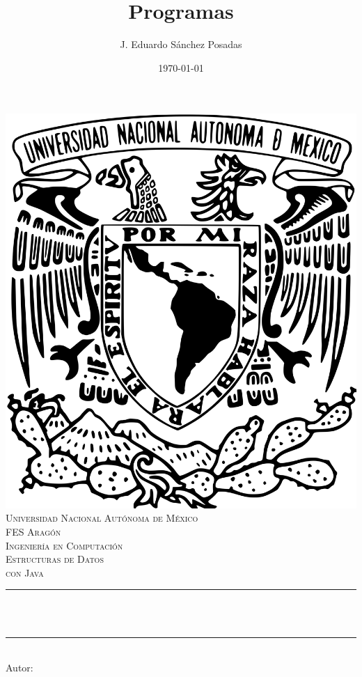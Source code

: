 \documentclass[11pt]{article}
\title{Programas}						%
\author{J. Eduardo Sánchez Posadas}					%
\date{\today}											%
\makeatletter
\let\thetitle\@title
\let\theauthor\@author
\makeatother
\begin{document}

\begin{titlepage}
	\centering
    \vspace*{0.5 cm}
    \includegraphics[scale=0.05]{pics/escudo.png} \\[1.0 cm]	%
    \textsc{\Large Universidad Nacional Autónoma de México}\\[2.0 cm]	%
	\textsc{\Large FES Aragón\\ Ingeniería en Computación}\\[0.5 cm]								%
	\textsc{\Large Estructuras de Datos \\ con Java}\\[0.5 cm]	%
	\rule{\linewidth}{0.2 mm} \\[0.4 cm]
	{ \huge \bfseries \thetitle}\\
	\rule{\linewidth}{0.2 mm} \\[1.5 cm]
	 			{Autor: \large \theauthor}
%
	

\end{titlepage}
\end{document}
